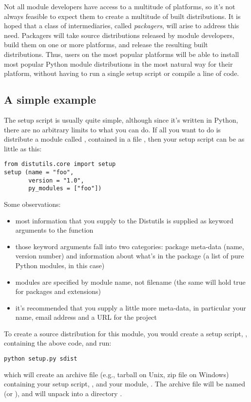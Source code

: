 \documentclass{howto}
\begin{document}
Not all module developers have access to a multitude of platforms, so
it's not always feasible to expect them to create a multitude of built
distributions.  It is hoped that a class of intermediaries, called
\emph{packagers}, will arise to address this need.  Packagers will take
source distributions released by module developers, build them on one or
more platforms, and release the resulting built distributions.  Thus,
users on the most popular platforms will be able to install most popular
Python module distributions in the most natural way for their platform,
without having to run a single setup script or compile a line of code.


\subsection{A simple example}
\label{simple-example}

The setup script is usually quite simple, although since it's written in
Python, there are no arbitrary limits to what you can do.  If all you
want to do is distribute a module called , contained in a
file , then your setup script can be as little as this:
\begin{verbatim}
from distutils.core import setup
setup (name = "foo",
       version = "1.0",
       py_modules = ["foo"])
\end{verbatim}

Some observations:
\begin{itemize}
\item most information that you supply to the Distutils is supplied as
  keyword arguments to the  function
\item those keyword arguments fall into two categories: package
  meta-data (name, version number) and information about what's in the
  package (a list of pure Python modules, in this case)
\item modules are specified by module name, not filename (the same will
  hold true for packages and extensions)
\item it's recommended that you supply a little more meta-data, in
  particular your name, email address and a URL for the project
\end{itemize}

To create a source distribution for this module, you would create a
setup script, , containing the above code, and run:
\begin{verbatim}
python setup.py sdist
\end{verbatim}
which will create an archive file (e.g., tarball on Unix, zip file on
Windows) containing your setup script, , and your module,
.  The archive file will be named  (or
), and will unpack into a directory .
\end{document}
